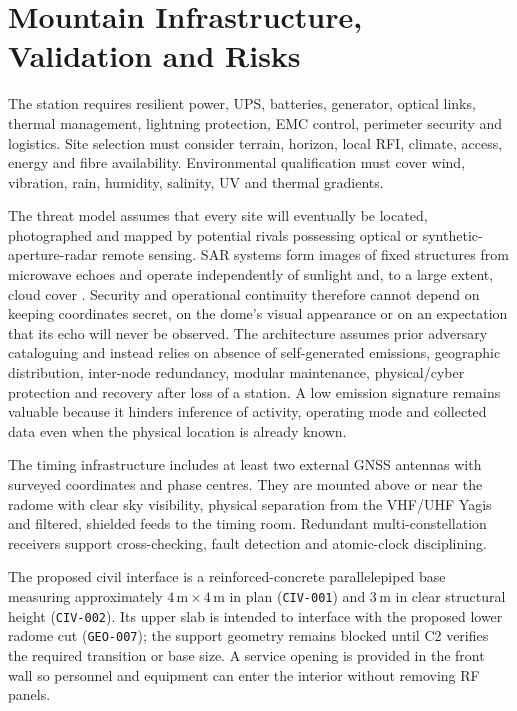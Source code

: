 \chapter{Mountain Infrastructure, Validation and Risks}

The station requires resilient power, UPS, batteries, generator, optical links, thermal management, lightning protection, EMC control, perimeter security and logistics. Site selection must consider terrain, horizon, local RFI, climate, access, energy and fibre availability. Environmental qualification must cover wind, vibration, rain, humidity, salinity, UV and thermal gradients.

The threat model assumes that every site will eventually be located, photographed and mapped by potential rivals possessing optical or synthetic-aperture-radar remote sensing. SAR systems form images of fixed structures from microwave echoes and operate independently of sunlight and, to a large extent, cloud cover \citep{esa_sar_intro}. Security and operational continuity therefore cannot depend on keeping coordinates secret, on the dome's visual appearance or on an expectation that its echo will never be observed. The architecture assumes prior adversary cataloguing and instead relies on absence of self-generated emissions, geographic distribution, inter-node redundancy, modular maintenance, physical/cyber protection and recovery after loss of a station. A low emission signature remains valuable because it hinders inference of activity, operating mode and collected data even when the physical location is already known.

The timing infrastructure includes at least two external GNSS antennas with surveyed coordinates and phase centres. They are mounted above or near the radome with clear sky visibility, physical separation from the VHF/UHF Yagis and filtered, shielded feeds to the timing room. Redundant multi-constellation receivers support cross-checking, fault detection and atomic-clock disciplining.

The proposed civil interface is a reinforced-concrete parallelepiped base measuring approximately $4\,\mathrm{m}\times4\,\mathrm{m}$ in plan (\texttt{CIV-001}) and $3\,\mathrm{m}$ in clear structural height (\texttt{CIV-002}). Its upper slab is intended to interface with the proposed lower radome cut (\texttt{GEO-007}); the support geometry remains blocked until C2 verifies the required transition or base size. A service opening is provided in the front wall so personnel and equipment can enter the interior without removing RF panels.

